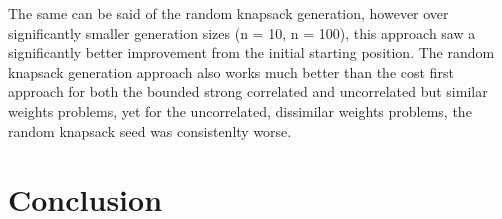 \documentclass[a4paper, 12pt]{article}
\begin{document}
The same can be said of the random knapsack generation, however over significantly smaller generation sizes (n = 10, n = 100), this approach saw a significantly better improvement from the initial starting position. The random knapsack generation approach also works much better than the cost first approach for both the bounded strong correlated and uncorrelated but similar weights problems, yet for the uncorrelated, dissimilar weights problems, the random knapsack seed was consistenlty worse. \\

\newpage

\section{Conclusion}
\end{document}
